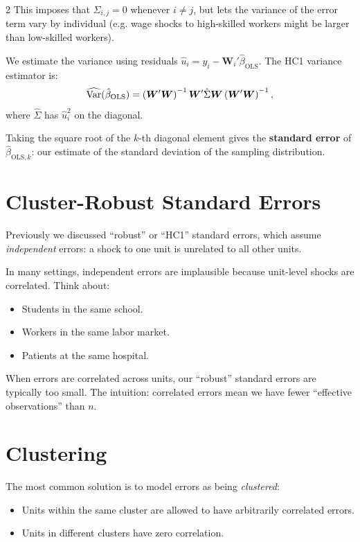 \documentclass[12pt]{article}
\begin{document}
\begin{multicols}{2}
  This imposes that $\Sigma_{i,j} = 0$ whenever $i \neq j$, but lets the variance of the error term vary by individual (e.g. wage shocks to high-skilled workers might be larger than low-skilled workers).

  We estimate the variance using residuals $\hat{u}_i = y_i - \bm{W}_i' \hat{\beta}_{\text{OLS}}$. The HC1 variance estimator is:
  $$
  \widehat{\var}(\hat{\beta}_{\text{OLS}}) = \left(\bm{W}' \bm{W} \right)^{-1} \bm{W}' \hat{\Sigma} \bm{W} \left(\bm{W}' \bm{W} \right)^{-1},
  $$
  where $\hat{\Sigma}$ has $\hat{u}_i^2$ on the diagonal.

  Taking the square root of the $k$-th diagonal element gives the \textbf{standard error} of $\hat{\beta}_{\text{OLS}, k}$: our estimate of the standard deviation of the sampling distribution.

  \section*{Cluster-Robust Standard Errors}

  Previously we discussed ``robust'' or ``HC1'' standard errors, which assume \emph{independent} errors: a shock to one unit is unrelated to all other units.

  In many settings, independent errors are implausible because unit-level shocks are correlated. Think about:
  \begin{itemize}
    \item Students in the same school.
    \item Workers in the same labor market.
    \item Patients at the same hospital.
  \end{itemize}

  When errors are correlated across units, our ``robust'' standard errors are typically too small. The intuition: correlated errors mean we have fewer ``effective observations'' than $n$.

  \section*{Clustering}

  The most common solution is to model errors as being \emph{clustered}:
  \begin{itemize}
    \item Units within the same cluster are allowed to have arbitrarily correlated errors.
    \item Units in different clusters have zero correlation.
  \end{itemize}


\end{multicols}
\end{document}
